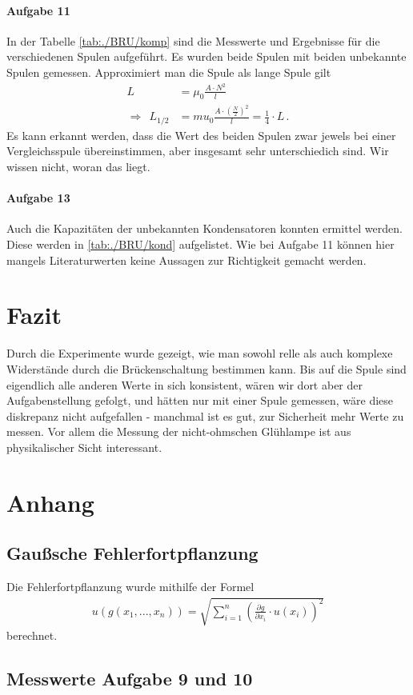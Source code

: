 \documentclass[11pt, a4paper]{article}
\begin{document}
    \paragraph{Aufgabe 11}
    In der Tabelle \ref{tab:./BRU/komp} sind die Messwerte und Ergebnisse für die verschiedenen Spulen aufgeführt. Es wurden beide Spulen mit beiden unbekannte Spulen gemessen. Approximiert man die Spule als lange Spule gilt
    \begin{align}
        L &= \mu_0 \frac{A\cdot N^2}{l} \\
        \Rightarrow \ \ L_{1/2} &= mu_0 \frac{A\cdot \left(\frac{N}{2}\right)^2}{l} = \frac{1}{4} \cdot L \,. \label{lspu}
    \end{align}
    Es kann erkannt werden, dass die Wert des beiden Spulen zwar jewels bei einer Vergleichsspule übereinstimmen, aber insgesamt sehr unterschiedich sind. Wir wissen nicht, woran das liegt.

    

    \paragraph{Aufgabe 13}
    Auch die Kapazitäten der unbekannten Kondensatoren konnten ermittel werden. Diese werden in \ref{tab:./BRU/kond} aufgelistet. Wie bei Aufgabe 11 können hier mangels Literaturwerten keine Aussagen zur Richtigkeit gemacht werden.
    
    

    \section{Fazit}
    Durch die Experimente wurde gezeigt, wie man sowohl relle als auch komplexe Widerstände durch die Brückenschaltung bestimmen kann. Bis auf die Spule sind eigendlich alle anderen Werte in sich konsistent, wären wir dort aber der Aufgabenstellung gefolgt, und hätten nur mit einer Spule gemessen, wäre diese diskrepanz nicht aufgefallen - manchmal ist es gut, zur Sicherheit mehr Werte zu messen. Vor allem die Messung der nicht-ohmschen Glühlampe ist aus physikalischer Sicht interessant.

    \section{Anhang}
    \subsection{Gaußsche Fehlerfortpflanzung}
    Die Fehlerfortpflanzung wurde mithilfe der Formel
    \begin{align}
        u\left(g \left(x_1, ..., x_n\right)\right) = \sqrt{\sum_{i=1}^n \left( \frac{\partial g }{\partial x_i} \cdot u\left(x_i\right) \right)^2} \label{gauss}
    \end{align}
    berechnet.
    \subsection{Messwerte Aufgabe 9 und 10}
    

    
    
\end{document}
